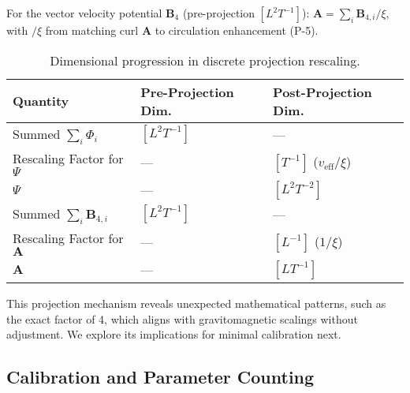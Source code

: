 For the vector velocity potential $\mathbf{B}_4$ (pre-projection $[L^2 T^{-1}]$): $\mathbf{A} = \sum_i \mathbf{B}_{4,i} / \xi$, with $/ \xi$ from matching curl $\mathbf{A}$ to circulation enhancement (P-5).

\begin{table}[H]
\centering
\begin{tabular}{|l|l|l|}
\hline
Quantity & Pre-Projection Dim. & Post-Projection Dim. \\
\hline
Summed $\sum_i \Phi_i$ & $[L^2 T^{-1}]$ & --- \\
Rescaling Factor for $\Psi$ & --- & $[T^{-1}]$ ($v_{\text{eff}} / \xi$) \\
$\Psi$ & --- & $[L^2 T^{-2}]$ \\
Summed $\sum_i \mathbf{B}_{4,i}$ & $[L^2 T^{-1}]$ & --- \\
Rescaling Factor for $\mathbf{A}$ & --- & $[L^{-1}]$ ($1 / \xi$) \\
$\mathbf{A}$ & --- & $[L T^{-1}]$ \\
\hline
\end{tabular}
\caption{Dimensional progression in discrete projection rescaling.}
\label{tab:dim-projection}
\end{table}

\medskip
\noindent
{}
\medskip

This projection mechanism reveals unexpected mathematical patterns, such as the exact factor of 4, which aligns with gravitomagnetic scalings without adjustment. We explore its implications for minimal calibration next.

\subsection{Calibration and Parameter Counting}

